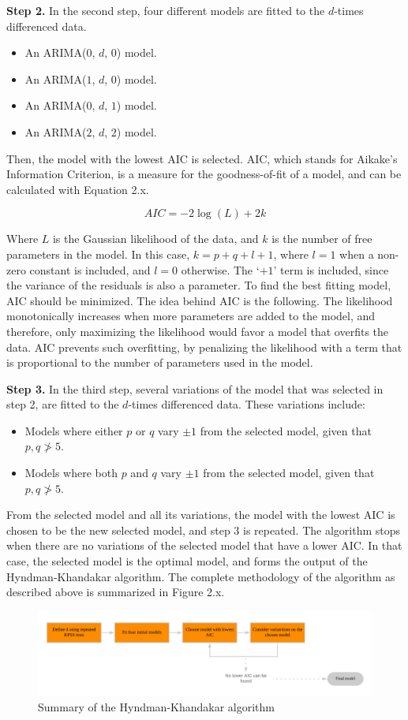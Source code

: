 \documentclass[12pt,oneside]{reedthesis}
\providecommand{\tightlist}{%
  \setlength{\itemsep}{0pt}\setlength{\parskip}{0pt}}
\begin{document}
\textbf{Step 2.} In the second step, four different models are fitted to
the \(d\)-times differenced data.
\begin{itemize}
\tightlist
\item
  An ARIMA(\(0\), \(d\), \(0\)) model.
\item
  An ARIMA(\(1\), \(d\), \(0\)) model.
\item
  An ARIMA(\(0\), \(d\), \(1\)) model.
\item
  An ARIMA(\(2\), \(d\), \(2\)) model.
\end{itemize}
Then, the model with the lowest AIC is selected. AIC, which stands for
Aikake's Information Criterion, is a measure for the goodness-of-fit of
a model, and can be calculated with Equation 2.x.

\[ AIC = -2 \log(L) + 2k\]

Where \(L\) is the Gaussian likelihood of the data, and \(k\) is the
number of free parameters in the model. In this case,
\(k = p + q + l + 1\), where \(l = 1\) when a non-zero constant is
included, and \(l = 0\) otherwise. The `\(+1\)' term is included, since
the variance of the residuals is also a parameter. To find the best
fitting model, AIC should be minimized. The idea behind AIC is the
following. The likelihood monotonically increases when more parameters
are added to the model, and therefore, only maximizing the likelihood
would favor a model that overfits the data. AIC prevents such
overfitting, by penalizing the likelihood with a term that is
proportional to the number of parameters used in the model.

\textbf{Step 3.} In the third step, several variations of the model that
was selected in step 2, are fitted to the \(d\)-times differenced data.
These variations include:
\begin{itemize}
\tightlist
\item
  Models where either \(p\) or \(q\) vary \(\pm 1\) from the selected
  model, given that \(p, q \ngtr 5\).
\item
  Models where both \(p\) and \(q\) vary \(\pm 1\) from the selected
  model, given that \(p, q \ngtr 5\).
\end{itemize}
From the selected model and all its variations, the model with the
lowest AIC is chosen to be the new selected model, and step 3 is
repeated. The algorithm stops when there are no variations of the
selected model that have a lower AIC. In that case, the selected model
is the optimal model, and forms the output of the Hyndman-Khandakar
algorithm. The complete methodology of the algorithm as described above
is summarized in Figure 2.x.
\begin{figure}[h]
\includegraphics[width=\textwidth]{Figures/hyndman} \caption{Summary of the Hyndman-Khandakar algorithm}\label{fig:hyndman}
\end{figure}
\end{document}
